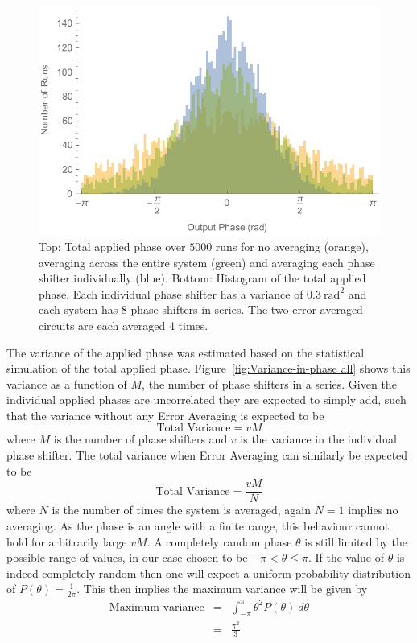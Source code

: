 \documentclass[aps,pra,twocolumn,superscriptaddress,numerical,floatfix]{revtex4-1}
\begin{document}
%
\begin{figure}
\centerline{\includegraphics[width=\columnwidth]{totphase2.pdf}}
\caption{Top: Total applied phase over $5000$ runs for no averaging (orange), averaging across the entire system (green) and averaging each phase shifter individually (blue). Bottom: Histogram of the total applied phase. Each individual phase shifter has a variance of $0.3\ \textrm{rad}^{2}$ and each system has $8$ phase shifters in series. The two error averaged circuits are each averaged $4$ times. \label{fig:Total-applied-phase2}}
\end{figure}

The variance of the applied phase was estimated based on the statistical simulation of the total applied phase. Figure~\ref{fig:Variance-in-phase all} shows this variance as a function of $M$, the number of phase shifters in a series. Given the individual applied phases are uncorrelated they are expected to simply add, such that the variance without any Error Averaging is expected to be
\begin{equation}
\textrm{Total Variance}=vM\label{eq:Tot Var no correction}
\end{equation}
where $M$ is the number of phase shifters and $v$ is the variance in the individual phase shifter. The total variance when Error Averaging can similarly be expected to be
\begin{equation}
\textrm{Total Variance}=\frac{vM}{N}\label{eq:Tot Var w/ correction}
\end{equation}
where $N$ is the number of times the system is averaged, again $N=1$ implies no averaging. As the phase is an angle with a finite range, this behaviour cannot hold for arbitrarily large $vM$. A completely random phase $\theta$ is still limited by the possible range of values, in our case chosen to be $-\pi<\theta\le\pi$. If the value of $\theta$ is indeed completely random then one will expect a uniform probability distribution of $P\left(\theta\right)=\frac{1}{2\pi}$. This then implies the maximum variance will be given by
\begin{eqnarray}
\textrm{Maximum variance} & = & \int_{-\pi}^{\pi}\theta^{2}P\left(\theta\right)\ d\theta\nonumber \\
& = & \frac{\pi^{2}}{3}\label{eq:Max Var}
\end{eqnarray}
\end{document}
